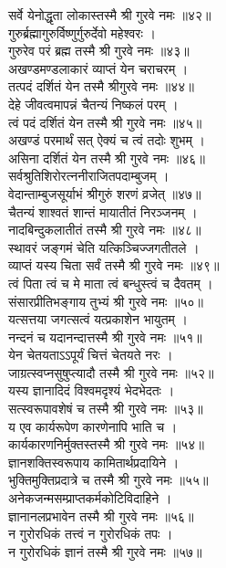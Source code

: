 सर्वे येनोद्धृता लोकास्तस्मै श्री गुरवे नमः ॥४२॥\\
गुरुर्ब्रह्मागुरुर्विष्णुर्गुरुर्देवो महेश्वरः ।\\
गुरुरेव परं ब्रह्म तस्मै श्री गुरवे नमः ॥४३॥\\
अखण्डमण्डलाकारं व्याप्तं येन चराचरम् ।\\
तत्पदं दर्शितं येन तस्मै श्रीगुरवे नमः ॥४४॥\\
देहे जीवत्वमापन्नं चैतन्यं निष्कलं परम् ।\\
त्वं पदं दर्शितं येन तस्मै श्री गुरवे नमः ॥४५॥\\
अखण्डं परमार्थं सत् ऐक्यं च त्वं तदोः शुभम् ।\\
असिना दर्शितं येन तस्मै श्री गुरवे नमः ॥४६॥\\
सर्वश्रुतिशिरोरत्ननीराजितपदाम्बुजम् ।\\
वेदान्ताम्बुजसूर्याभं श्रीगुरुं शरणं व्रजेत् ॥४७॥\\
चैतन्यं शाश्वतं शान्तं मायातीतं निरञ्जनम् ।\\
नादबिन्दुकलातीतं तस्मै श्री गुरवे नमः ॥४८॥\\
स्थावरं जङ्गमं चेति यत्किञ्चिज्जगतीतले ।\\
व्याप्तं यस्य चिता सर्वं तस्मै श्री गुरवे नमः ॥४९॥\\
त्वं पिता त्वं च मे माता त्वं बन्धुस्त्वं च दैवतम् ।\\
संसारप्रीतिभङ्गाय तुभ्यं श्री गुरवे नमः ॥५०॥\\
यत्सत्तया जगत्सत्वं यत्प्रकाशेन भायुतम् ।\\
नन्दनं च यदानन्दात्तस्मै श्री गुरवे नमः ॥५१॥\\
येन चेतयताऽऽपूर्यं चित्तं चेतयते नरः ।\\
जाग्रत्स्वप्नसुषुप्त्यादौ तस्मै श्री गुरवे नमः ॥५२॥\\
यस्य ज्ञानादिदं विश्वमदृश्यं भेदभेदतः ।\\
सत्स्वरूपावशेषं च तस्मै श्री गुरवे नमः ॥५३॥\\
य एव कार्यरूपेण कारणेनापि भाति च ।\\
कार्यकारणनिर्मुक्तस्तस्मै श्री गुरवे नमः ॥५४॥\\
ज्ञानशक्तिस्वरूपाय कामितार्थप्रदायिने ।\\
भुक्तिमुक्तिप्रदात्रे च तस्मै श्री गुरवे नमः ॥५५॥\\
अनेकजन्मसम्प्राप्तकर्मकोटिविदाहिने ।\\
ज्ञानानलप्रभावेन तस्मै श्री गुरवे नमः ॥५६॥\\
न गुरोरधिकं तत्त्वं न गुरोरधिकं तपः ।\\
न गुरोरधिकं ज्ञानं तस्मै श्री गुरवे नमः ॥५७॥\\
